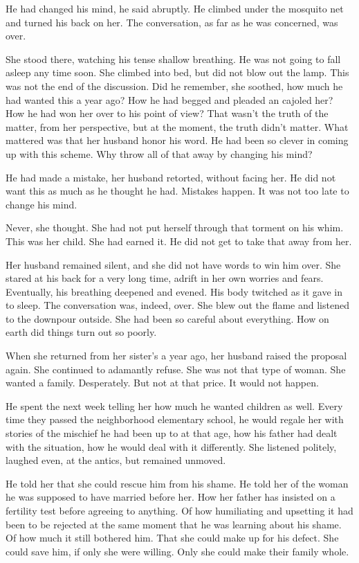\documentclass{article}
\newcommand{\egnote}{\todo[color=violet!30]}
\begin{document}
He had changed his mind, he said abruptly. He climbed under the mosquito net and turned his back on her. The conversation, as far as he was concerned, was over.

She stood there, watching his tense shallow breathing. He was not going to fall asleep any time soon. She climbed into bed, but did not blow out the lamp. This was not the end of the discussion. Did he remember, she soothed, how much he had wanted this a year ago? How he had begged and pleaded an cajoled her? How he had won her over to his point of view? That wasn't the truth of the matter, from her perspective, but at the moment, the truth didn't matter. What mattered was that her husband honor his word. He had been so clever in coming up with this scheme. Why throw all of that away by changing his mind?

He had made a mistake, her husband retorted, without facing her. He did not want this as much as he thought he had. Mistakes happen. It was not too late to change his mind. 

Never, she thought. She had not put herself through that torment on his whim. This was her child. She had earned it. He did not get to take that away from her.

Her husband remained silent, and she did not have words to win him over. She stared at his back for a very long time, adrift in her own worries and fears. Eventually, his breathing deepened and evened. His body twitched as it gave in to sleep. The conversation was, indeed, over. She blew out the flame and listened to the downpour outside. She had been so careful about everything. How on earth did things turn out so poorly. 

\egnote{timeline: a year ago, convincing her about the affair}
When she returned from her sister's a year ago, her husband raised the proposal again. She continued to adamantly refuse. She was not that type of woman. She wanted a family. Desperately. But not at that price. It would not happen.

He spent the next week telling her how much he wanted children as well. Every time they passed the neighborhood elementary school, he would regale her with stories of the mischief he had been up to at that age, how his father had dealt with the situation, how he would deal with it differently. She listened politely, laughed even, at the antics, but remained unmoved. 

He told her that she could rescue him from his shame. He told her of the woman he was supposed to have married before her. How her father has insisted on a fertility test before agreeing to anything. Of how humiliating and upsetting it had been to be rejected at the same moment that he was learning about his shame. Of how much it still bothered him. That she could make up for his defect. She could save him, if only she were willing. Only she could make their family whole. 
\end{document}
